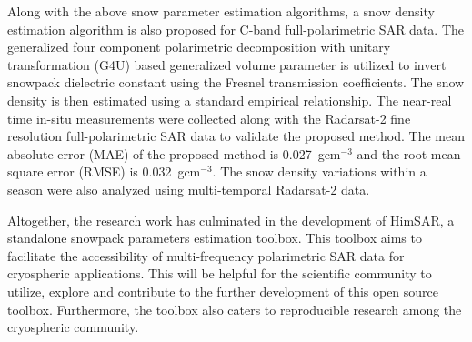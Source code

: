 Along with the above snow parameter estimation algorithms, a snow density estimation algorithm is also proposed for C-band full-polarimetric SAR data. The generalized four component polarimetric decomposition with unitary transformation (G4U) based generalized volume parameter is utilized to invert snowpack dielectric constant using the Fresnel transmission coefficients. The snow density is then estimated using a standard empirical relationship. The near-real time in-situ measurements were collected along with the Radarsat-2 fine resolution full-polarimetric SAR data to validate the proposed method. The mean absolute error (MAE) of the proposed method is 0.027~gcm$^{-3}$ and the root mean square error (RMSE) is 0.032~gcm$^{-3}$. The snow density variations within a season were also analyzed using multi-temporal Radarsat-2 data. 

Altogether, the research work has culminated in the development of HimSAR, a standalone snowpack parameters estimation toolbox. This toolbox aims to facilitate the accessibility of multi-frequency polarimetric SAR data for cryospheric applications. This will be helpful for the scientific community to utilize, explore and contribute to the further development of this open source toolbox. Furthermore, the toolbox also caters to reproducible research among the cryospheric community.    